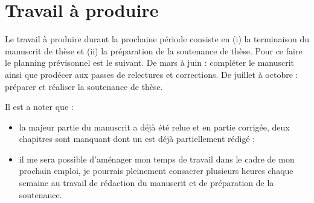 \section{Travail à produire}
\label{sec:to-do}

  Le travail à produire durant la prochaine période consiste en (i) la terminaison du manuscrit de thèse et (ii) la préparation de la soutenance de thèse. Pour ce faire le planning prévisonnel est le suivant. De mars à juin : compléter le manuscrit ainsi que prodécer aux passes de relectures et corrections. De juillet à octobre : préparer et réaliser la soutenance de thèse.

Il est a noter que :
\begin{itemize}
\item la majeur partie du manuscrit a déjà été relue et en partie corrigée, deux chapitres sont manquant dont un est déjà partiellement rédigé ;
\item il me sera possible d'aménager mon temps de travail dans le cadre de mon prochain emploi, je pourrais pleinement consacrer plusieurs heures chaque semaine au travail de rédaction du manuscrit et de préparation de la soutenance.
\end{itemize}

